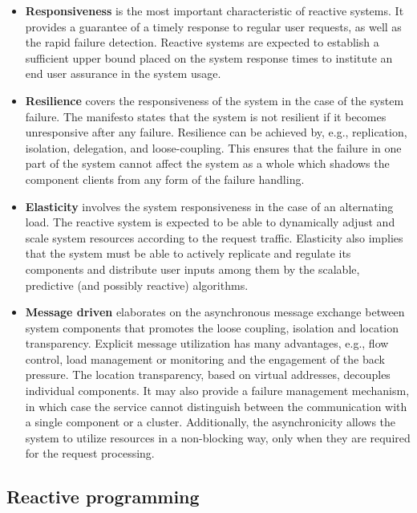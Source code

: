 \documentclass[oneside,
  digital, %
  table,   %
  lof,     %
  lot,     %
]{fithesis3}
\begin{document}
\begin{itemize}
    \item \textbf{Responsiveness} is the most important characteristic of reactive systems. It provides a guarantee of a timely response to regular user requests, as well as the rapid failure detection. Reactive systems are expected to establish a sufficient upper bound placed on the system response times to institute an end user assurance in the system usage.
    
    \item \textbf{Resilience} covers the responsiveness of the system in the case of the system failure. The manifesto states that the system is not resilient if it becomes unresponsive after any failure. Resilience can be achieved by, e.g., replication, isolation, delegation, and loose-coupling. This ensures that the failure in one part of the system cannot affect the system as a whole which shadows the component clients from any form of the failure handling.
    
    \item \textbf{Elasticity} involves the system responsiveness in the case of an alternating load. The reactive system is expected to be able to dynamically adjust and scale system resources according to the request traffic. Elasticity also implies that the system must be able to actively replicate and regulate its components and distribute user inputs among them by the scalable, predictive (and possibly reactive) algorithms.
    
    \item \textbf{Message driven} elaborates on the asynchronous message exchange between system components that promotes the loose coupling, isolation and location transparency. Explicit message utilization has many advantages, e.g., flow control, load management or monitoring and the engagement of the back pressure. The location transparency, based on virtual addresses, decouples individual components. It may also provide a failure management mechanism, in which case the service cannot distinguish between the communication with a single component or a cluster. Additionally, the asynchronicity allows the system to utilize resources in a non-blocking way, only when they are required for the request processing. 
\end{itemize}

\subsection{Reactive programming}
\end{document}
